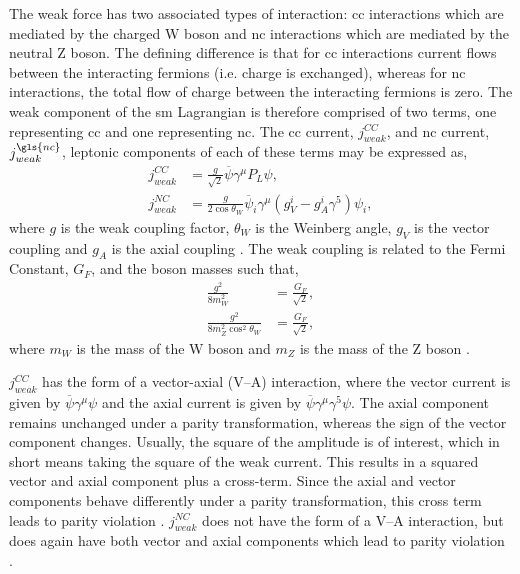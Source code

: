 The weak force has two associated types of interaction: \gls{cc} interactions which are mediated by the charged W boson and \gls{nc} interactions which are mediated by the neutral Z boson. The defining difference is that for \gls{cc} interactions current flows between the interacting fermions (i.e. charge is exchanged), whereas for \gls{nc} interactions, the total flow of charge between the interacting fermions is zero. The weak component of the \gls{sm} Lagrangian is therefore comprised of two terms, one representing \gls{cc} and one representing \gls{nc}. The \gls{cc} current, $j^{CC}_{weak}$,  and \gls{nc} current, $j^{\gls{nc}}_{weak}$, leptonic components of each of these terms may be expressed as, 
\begin{equation}\label{eqn:weak current}
\begin{split}
    j^{CC}_{weak} &= \frac{g}{\sqrt{2}}\overline{\psi}\gamma^{\mu}P_L\psi, \\
    j^{NC}_{weak} &= \frac{g}{2\cos{\theta_W}} \overline{\psi}_i \gamma^\mu (g_V^i - g_A^i \gamma^5)\psi_i, 
\end{split}
\end{equation}
where $g$ is the weak coupling factor, $\theta_W$ is the Weinberg angle, $g_V$ is the vector coupling and $g_A$ is the axial coupling \cite{Particles_and_Fundamental_Interactions:_An_Introduction_to_Particle_Physics}\cite{Fundamentals_of_Neutrino_Physics_and_Astrophysics}\cite{PDG_2022}. The weak coupling is related to the Fermi Constant, $G_F$, and the boson masses such that,
\begin{equation}
\begin{split}
    \frac{g^2}{8m^2_W} &= \frac{G_F}{\sqrt{2}}, \\
    \frac{g^2}{8m^2_Z\cos^2{\theta_W}} &= \frac{G_F}{\sqrt{2}},
\end{split}
\end{equation}
where $m_W$ is the mass of the W boson and $m_Z$ is the mass of the Z boson \cite{Fundamentals_of_Neutrino_Physics_and_Astrophysics}.

$j^{CC}_{weak}$ has the form of a vector-axial (V--A) interaction, where the vector current is given by $\overline{\psi}\gamma^\mu\psi$ and the axial current is given by $\overline{\psi}\gamma^\mu\gamma^5\psi$. The axial component remains unchanged under a parity transformation, whereas the sign of the vector component changes. Usually, the square of the amplitude is of interest, which in short means taking the square of the weak current. This results in a squared vector and axial component plus a cross-term. Since the axial and vector components behave differently under a parity transformation, this cross term leads to parity violation \cite{Particles_and_Fundamental_Interactions:_An_Introduction_to_Particle_Physics} \cite{Fundamentals_of_Neutrino_Physics_and_Astrophysics}. $j^{NC}_{weak}$ does not have the form of a V--A interaction, but does again have both vector and axial components which lead to parity violation \cite{Particles_and_Fundamental_Interactions:_An_Introduction_to_Particle_Physics}.

